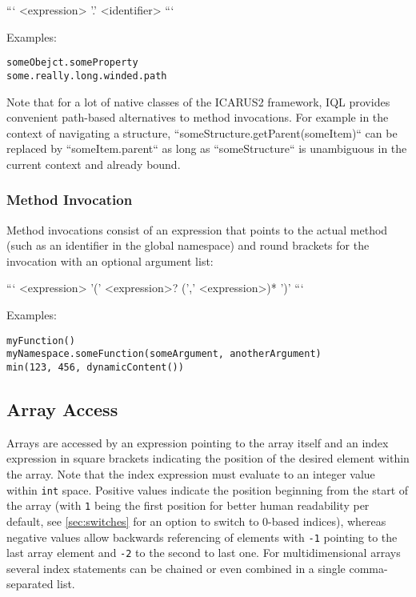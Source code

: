 \documentclass[11pt]{article}
\begin{document}
```
<expression> '.' <identifier>
```

Examples:

\begin{verbatim}
someObejct.someProperty
some.really.long.winded.path
\end{verbatim}

Note that for a lot of native classes of the ICARUS2 framework, IQL provides convenient path-based alternatives to method invocations. For example in  the context of navigating a structure, ``someStructure.getParent(someItem)`` can be replaced by ``someItem.parent`` as long as ``someStructure`` is unambiguous in the current context and already bound.

\subsubsection{Method Invocation}
\label{sec:method-invocations}

Method invocations consist of an expression that points to the actual method (such as an identifier in the global namespace) and round brackets for the invocation with an optional argument list:

```
<expression> '(' <expression>? (',' <expression>)* ')'
```

Examples:

\begin{verbatim}
myFunction()
myNamespace.someFunction(someArgument, anotherArgument)
min(123, 456, dynamicContent())
\end{verbatim}

\subsection{Array Access}
\label{sec:array-access}

Arrays are accessed by an expression pointing to the array itself and an index expression in square brackets indicating the position of the desired element within the array. Note that the index expression must evaluate to an integer value within \texttt{int} space. Positive values indicate the position beginning from the start of the array (with \texttt{1} being the first position for better human readability per default, see \cref{sec:switches} for an option to switch to 0-based indices), whereas negative values allow backwards referencing of elements with \texttt{-1} pointing to the last array element and \texttt{-2} to the second to last one. For multidimensional arrays several index statements can be chained or even combined in a single comma-separated list.
\end{document}
